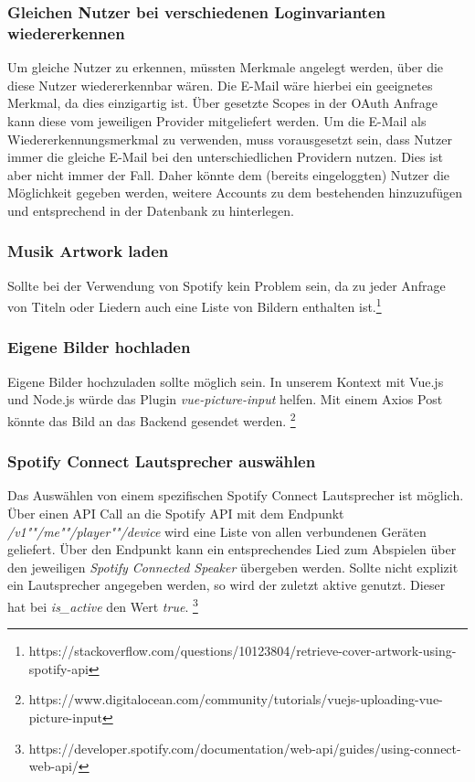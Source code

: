 \documentclass[10pt, a4paper, draft]{article}
\begin{document}
\subsubsection{Gleichen Nutzer bei verschiedenen Loginvarianten wiedererkennen}
Um gleiche Nutzer zu erkennen, müssten Merkmale angelegt werden, über die diese Nutzer wiedererkennbar wären.
Die E-Mail wäre hierbei ein geeignetes Merkmal, da dies einzigartig ist. Über gesetzte Scopes in der OAuth Anfrage kann diese vom jeweiligen Provider mitgeliefert werden.
Um die E-Mail als Wiedererkennungsmerkmal zu verwenden, muss vorausgesetzt sein, dass Nutzer immer die gleiche E-Mail bei den unterschiedlichen Providern nutzen. Dies ist aber nicht immer der Fall.
Daher könnte dem (bereits eingeloggten) Nutzer die Möglichkeit gegeben werden, weitere Accounts zu dem bestehenden hinzuzufügen und entsprechend in der Datenbank zu hinterlegen.

\subsubsection{Musik Artwork laden}
Sollte bei der Verwendung von Spotify kein Problem sein, da zu jeder Anfrage von Titeln oder Liedern auch eine Liste von Bildern enthalten ist.\footnote{https://stackoverflow.com/questions/10123804/retrieve-cover-artwork-using-spotify-api}

\subsubsection{Eigene Bilder hochladen}
Eigene Bilder hochzuladen sollte möglich sein. In unserem Kontext mit Vue.js und Node.js würde das Plugin \textit{vue-picture-input} helfen.
Mit einem Axios Post könnte das Bild an das Backend gesendet werden. \footnote{https://www.digitalocean.com/community/tutorials/vuejs-uploading-vue-picture-input}

\subsubsection{Spotify Connect Lautsprecher auswählen}
Das Auswählen von einem spezifischen Spotify Connect Lautsprecher ist möglich.
Über einen API Call an die Spotify API mit dem Endpunkt \textit{/v1""/me""/player""/device} wird eine Liste von allen verbundenen Geräten geliefert. Über den Endpunkt kann ein entsprechendes Lied zum Abspielen über den jeweiligen \textit{Spotify Connected Speaker} übergeben werden.
Sollte nicht explizit ein Lautsprecher angegeben werden, so wird der zuletzt aktive genutzt. Dieser hat bei \textit{is\_active} den Wert \textit{true}. \footnote{https://developer.spotify.com/documentation/web-api/guides/using-connect-web-api/}
\end{document}
